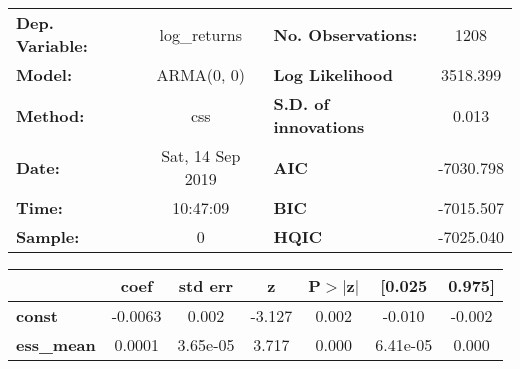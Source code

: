 \begin{center}
\begin{tabular}{lclc}
\toprule
\textbf{Dep. Variable:} &   log\_returns   & \textbf{  No. Observations:  } &    1208     \\
\textbf{Model:}         &    ARMA(0, 0)    & \textbf{  Log Likelihood     } &  3518.399   \\
\textbf{Method:}        &       css        & \textbf{  S.D. of innovations} &   0.013     \\
\textbf{Date:}          & Sat, 14 Sep 2019 & \textbf{  AIC                } & -7030.798   \\
\textbf{Time:}          &     10:47:09     & \textbf{  BIC                } & -7015.507   \\
\textbf{Sample:}        &        0         & \textbf{  HQIC               } & -7025.040   \\
\bottomrule
\end{tabular}
\begin{tabular}{lcccccc}
                   & \textbf{coef} & \textbf{std err} & \textbf{z} & \textbf{P$> |$z$|$} & \textbf{[0.025} & \textbf{0.975]}  \\
\midrule
\textbf{const}     &      -0.0063  &        0.002     &    -3.127  &         0.002        &       -0.010    &       -0.002     \\
\textbf{ess\_mean} &       0.0001  &     3.65e-05     &     3.717  &         0.000        &     6.41e-05    &        0.000     \\
\bottomrule
\end{tabular}
\end{center}
